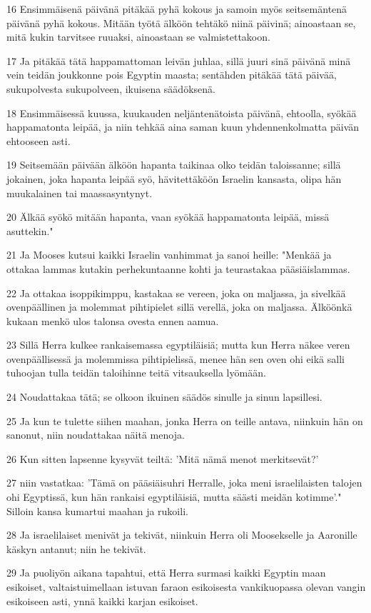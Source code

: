 \par 16 Ensimmäisenä päivänä pitäkää pyhä kokous ja samoin myös seitsemäntenä päivänä pyhä kokous. Mitään työtä älköön tehtäkö niinä päivinä; ainoastaan se, mitä kukin tarvitsee ruuaksi, ainoastaan se valmistettakoon.
\par 17 Ja pitäkää tätä happamattoman leivän juhlaa, sillä juuri sinä päivänä minä vein teidän joukkonne pois Egyptin maasta; sentähden pitäkää tätä päivää, sukupolvesta sukupolveen, ikuisena säädöksenä.
\par 18 Ensimmäisessä kuussa, kuukauden neljäntenätoista päivänä, ehtoolla, syökää happamatonta leipää, ja niin tehkää aina saman kuun yhdennenkolmatta päivän ehtooseen asti.
\par 19 Seitsemään päivään älköön hapanta taikinaa olko teidän taloissanne; sillä jokainen, joka hapanta leipää syö, hävitettäköön Israelin kansasta, olipa hän muukalainen tai maassasyntynyt.
\par 20 Älkää syökö mitään hapanta, vaan syökää happamatonta leipää, missä asuttekin."
\par 21 Ja Mooses kutsui kaikki Israelin vanhimmat ja sanoi heille: "Menkää ja ottakaa lammas kutakin perhekuntaanne kohti ja teurastakaa pääsiäislammas.
\par 22 Ja ottakaa isoppikimppu, kastakaa se vereen, joka on maljassa, ja sivelkää ovenpäällinen ja molemmat pihtipielet sillä verellä, joka on maljassa. Älköönkä kukaan menkö ulos talonsa ovesta ennen aamua.
\par 23 Sillä Herra kulkee rankaisemassa egyptiläisiä; mutta kun Herra näkee veren ovenpäällisessä ja molemmissa pihtipielissä, menee hän sen oven ohi eikä salli tuhoojan tulla teidän taloihinne teitä vitsauksella lyömään.
\par 24 Noudattakaa tätä; se olkoon ikuinen säädös sinulle ja sinun lapsillesi.
\par 25 Ja kun te tulette siihen maahan, jonka Herra on teille antava, niinkuin hän on sanonut, niin noudattakaa näitä menoja.
\par 26 Kun sitten lapsenne kysyvät teiltä: 'Mitä nämä menot merkitsevät?'
\par 27 niin vastatkaa: 'Tämä on pääsiäisuhri Herralle, joka meni israelilaisten talojen ohi Egyptissä, kun hän rankaisi egyptiläisiä, mutta säästi meidän kotimme'." Silloin kansa kumartui maahan ja rukoili.
\par 28 Ja israelilaiset menivät ja tekivät, niinkuin Herra oli Moosekselle ja Aaronille käskyn antanut; niin he tekivät.
\par 29 Ja puoliyön aikana tapahtui, että Herra surmasi kaikki Egyptin maan esikoiset, valtaistuimellaan istuvan faraon esikoisesta vankikuopassa olevan vangin esikoiseen asti, ynnä kaikki karjan esikoiset.
